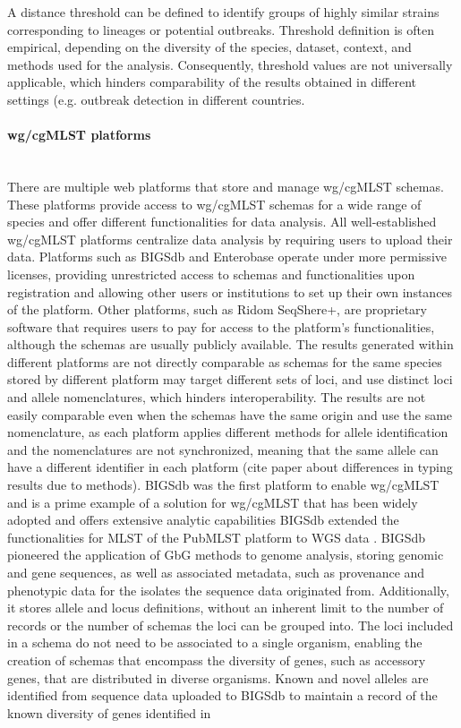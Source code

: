 A distance threshold can be defined to identify groups of highly similar strains corresponding to lineages or potential outbreaks. Threshold definition is often empirical, depending on the diversity of the species, dataset, context, and methods used for the analysis. Consequently, threshold values are not universally applicable, which hinders comparability of the results obtained in different settings (e.g. outbreak detection in different countries.

\paragraph{wg/cgMLST platforms} \mbox{}\\

There are multiple web platforms that store and manage \ac{wg/cgMLST} schemas. These platforms provide access to \ac{wg/cgMLST} schemas for a wide range of species and offer different functionalities for data analysis. All well-established \ac{wg/cgMLST} platforms centralize data analysis by requiring users to upload their data. Platforms such as \ac{BIGSdb} and Enterobase operate under more permissive licenses, providing unrestricted access to schemas and functionalities upon registration and allowing other users or institutions to set up their own instances of the platform. Other platforms, such as Ridom SeqShere+, are proprietary software that requires users to pay for access to the platform's functionalities, although the schemas are usually publicly available. The results generated within different platforms are not directly comparable as schemas for the same species stored by different platform may target different sets of loci, and use distinct loci and allele nomenclatures, which hinders interoperability. The results are not easily comparable even when the schemas have the same origin and use the same nomenclature, as each platform applies different methods for allele identification and the nomenclatures are not synchronized, meaning that the same allele can have a different identifier in each platform (cite paper about differences in typing results due to methods). \ac{BIGSdb} was the first platform to enable \ac{wg/cgMLST} and is a prime example of a solution for \ac{wg/cgMLST} that has been widely adopted and offers extensive analytic capabilities \ac{BIGSdb} extended the functionalities for \ac{MLST} of the PubMLST platform to \ac{WGS} data \cite{jolley_bigsdb_2010, jolley_open-access_2018}. \ac{BIGSdb} pioneered the application of \ac{GbG} methods to genome analysis, storing genomic and gene sequences, as well as associated metadata, such as provenance and phenotypic data for the isolates the sequence data originated from. Additionally, it stores allele and locus definitions, without an inherent limit to the number of records or the number of schemas the loci can be grouped into. The loci included in a schema do not need to be associated to a single organism, enabling the creation of schemas that encompass the diversity of genes, such as accessory genes, that are distributed in diverse organisms. Known and novel alleles are identified from sequence data uploaded to \ac{BIGSdb} to maintain a record of the known diversity of genes identified in 